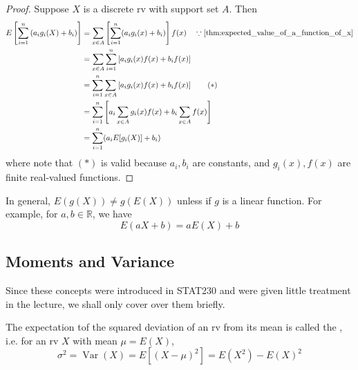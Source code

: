 \documentclass[notoc,notitlepage]{tufte-book}
\DeclareMathOperator{\Var}{Var }
\begin{document}
\begin{proof}
  Suppose $X$ is a discrete rv with support set $A$. Then
  \begin{align*}
    E \left[ \sum_{i = 1}^{n} \left( a_i g_i(X) + b_i \right) \right]
      &= \sum_{x \in A} \left[ \sum_{i = 1}^{n} ( a_i g_i(x) + b_i ) \right] f(x) \quad \because \cref{thm:expected_value_of_a_function_of_x} \\
      &= \sum_{x \in A} \sum_{i = 1}^{n} \left[ a_i g_i(x) f(x) + b_i f(x) \right] \\
      &= \sum_{i = 1}^{n} \sum_{x \in A} \left[ a_i g_i(x) f(x) + b_i f(x) \right] \qquad (*) \\
      &= \sum_{i = 1}^{n} \left[ a_i \sum_{x \in A} g_i(x) f(x) + b_i \sum_{x \in A} f(x) \right] \\
      &= \sum_{i = 1}^{n} (a_i E[g_i(X)] + b_i)
  \end{align*}
  where note that $(*)$ is valid because $a_i, b_i$ are constants, and $g_i(x), f(x)$ are finite real-valued functions.
\end{proof}

\begin{note}
  In general, $E(g(X)) \neq g(E(X))$ unless if $g$ is a linear function. For example, for $a, b \in \mathbb{R}$, we have
  \begin{equation*}
    E(aX + b) = aE(X) + b
  \end{equation*}
\end{note}


\subsection{Moments and Variance}%
\label{sub:moments_and_variance}

Since these concepts were introduced in STAT230 and were given little treatment in the lecture, we shall only cover over them briefly.

\begin{defn}[Variance]
\label{defn:variance}
  The expectation tof the squared deviation of an rv from its mean is called the , i.e. for an rv $X$ with mean $\mu = E(X)$,
  \begin{equation*}
    \sigma^2 = \Var(X) = E[ (X - \mu)^2 ] = E(X^2) - E(X)^2
  \end{equation*}
\end{defn}
\end{document}
